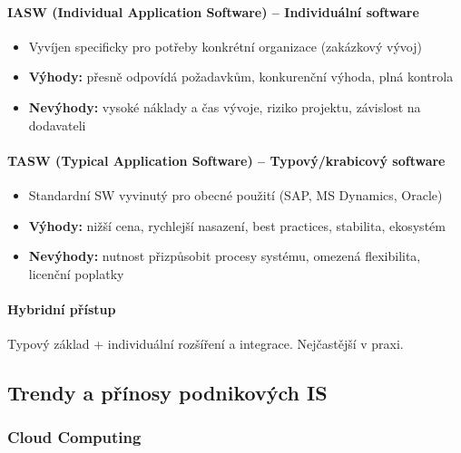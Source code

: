 \paragraph{IASW (Individual Application Software) -- Individuální software}
\begin{itemize}
  \item Vyvíjen specificky pro potřeby konkrétní organizace (zakázkový vývoj)
  \item \textbf{Výhody:} přesně odpovídá požadavkům, konkurenční výhoda, plná kontrola
  \item \textbf{Nevýhody:} vysoké náklady a čas vývoje, riziko projektu, závislost na dodavateli
\end{itemize}

\paragraph{TASW (Typical Application Software) -- Typový/krabicový software}
\begin{itemize}
  \item Standardní SW vyvinutý pro obecné použití (SAP, MS Dynamics, Oracle)
  \item \textbf{Výhody:} nižší cena, rychlejší nasazení, best practices, stabilita, ekosystém
  \item \textbf{Nevýhody:} nutnost přizpůsobit procesy systému, omezená flexibilita, licenční poplatky
\end{itemize}

\paragraph{Hybridní přístup}
Typový základ + individuální rozšíření a integrace. Nejčastější v praxi.

\subsection{Trendy a přínosy podnikových IS}

\subsubsection{Cloud Computing}

